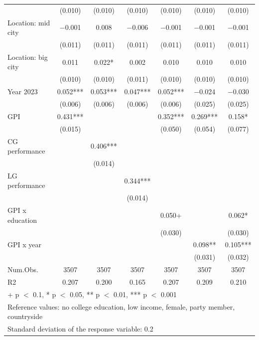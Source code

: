 \documentclass[
  letterpaper,
  DIV=11,
  numbers=noendperiod]{scrartcl}
\begin{document}
\begin{table}
{\begin{tabular}[t]{lcccccc}
 & (\num{0.010}) & (\num{0.010}) & (\num{0.010}) & (\num{0.010}) & (\num{0.010}) & (\num{0.010})\\
Location: mid city & \num{-0.001} & \num{0.008} & \num{-0.006} & \num{-0.001} & \num{-0.001} & \num{-0.001}\\
 & (\num{0.011}) & (\num{0.011}) & (\num{0.011}) & (\num{0.011}) & (\num{0.011}) & (\num{0.011})\\
Location: big city & \num{0.011} & \num{0.022}* & \num{0.002} & \num{0.010} & \num{0.010} & \num{0.010}\\
 & (\num{0.010}) & (\num{0.010}) & (\num{0.011}) & (\num{0.010}) & (\num{0.010}) & (\num{0.010})\\
Year 2023 & \num{0.052}*** & \num{0.053}*** & \num{0.047}*** & \num{0.052}*** & \num{-0.024} & \num{-0.030}\\
 & (\num{0.006}) & (\num{0.006}) & (\num{0.006}) & (\num{0.006}) & (\num{0.025}) & (\num{0.025})\\
GPI & \num{0.431}*** &  &  & \num{0.352}*** & \num{0.269}*** & \num{0.158}*\\
 & (\num{0.015}) &  &  & (\num{0.050}) & (\num{0.054}) & (\num{0.077})\\
CG performance &  & \num{0.406}*** &  &  &  & \\
 &  & (\num{0.014}) &  &  &  & \\
LG performance &  &  & \num{0.344}*** &  &  & \\
 &  &  & (\num{0.014}) &  &  & \\
GPI x education &  &  &  & \num{0.050}+ &  & \num{0.062}*\\
 &  &  &  & (\num{0.030}) &  & (\num{0.030})\\
GPI x year &  &  &  &  & \num{0.098}** & \num{0.105}***\\
 &  &  &  &  & (\num{0.031}) & (\num{0.032})\\
\midrule
Num.Obs. & \num{3507} & \num{3507} & \num{3507} & \num{3507} & \num{3507} & \num{3507}\\
R2 & \num{0.207} & \num{0.200} & \num{0.165} & \num{0.207} & \num{0.209} & \num{0.210}\\
\bottomrule
\multicolumn{7}{l}{\rule{0pt}{1em}+ p $<$ 0.1, * p $<$ 0.05, ** p $<$ 0.01, *** p $<$ 0.001}\\
\multicolumn{7}{l}{\rule{0pt}{1em}Reference values: no college education, low income, female, party member, countryside}\\
\multicolumn{7}{l}{\rule{0pt}{1em}Standard deviation of the response variable:  0.2}\\
\end{tabular}

}

\end{table}%
\end{document}
